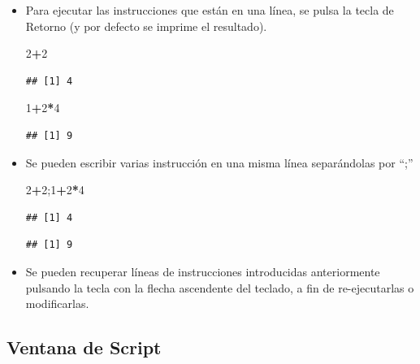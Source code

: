 \documentclass[]{book}
\newenvironment{Shaded}{\begin{snugshade}}{\end{snugshade}}
\newcommand{\DecValTok}[1]{\textcolor[rgb]{0.00,0.00,0.81}{#1}}
\newcommand{\OperatorTok}[1]{\textcolor[rgb]{0.81,0.36,0.00}{\textbf{#1}}}
\newcommand{\NormalTok}[1]{#1}
\begin{document}
\begin{itemize}
\item
  Para ejecutar las instrucciones que están en una línea, se pulsa la
  tecla de Retorno (y por defecto se imprime el resultado).

\begin{Shaded}
\begin{Highlighting}[]
\DecValTok{2}\OperatorTok{+}\DecValTok{2}
\end{Highlighting}
\end{Shaded}

\begin{verbatim}
## [1] 4
\end{verbatim}

\begin{Shaded}
\begin{Highlighting}[]
\DecValTok{1}\OperatorTok{+}\DecValTok{2}\OperatorTok{*}\DecValTok{4}
\end{Highlighting}
\end{Shaded}

\begin{verbatim}
## [1] 9
\end{verbatim}
\item
  Se pueden escribir varias instrucción en una misma línea separándolas
  por ``;''

\begin{Shaded}
\begin{Highlighting}[]
\DecValTok{2}\OperatorTok{+}\DecValTok{2}\NormalTok{;}\DecValTok{1}\OperatorTok{+}\DecValTok{2}\OperatorTok{*}\DecValTok{4}
\end{Highlighting}
\end{Shaded}

\begin{verbatim}
## [1] 4
\end{verbatim}

\begin{verbatim}
## [1] 9
\end{verbatim}
\item
  Se pueden recuperar líneas de instrucciones introducidas anteriormente
  pulsando la tecla con la flecha ascendente del teclado, a fin de
  re-ejecutarlas o modificarlas.
\end{itemize}

\subsection{Ventana de Script}\label{ventana-de-script}
\end{document}

